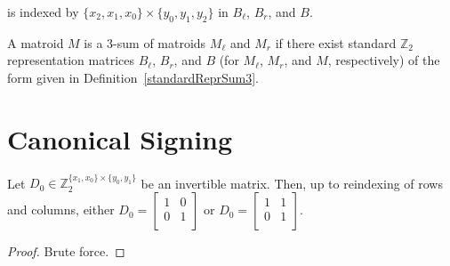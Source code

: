 \begin{definition}
    is indexed by $\{x_{2}, x_{1}, x_{0}\} \times \{y_{0}, y_{1}, y_{2}\}$ in $B_{\ell}$, $B_{r}$, and $B$.
\end{definition}

\begin{definition}
    \label{Matroid.IsSum3of}
    \leanok
    A matroid $M$ is a $3$-sum of matroids $M_{\ell}$ and $M_{r}$ if there exist standard $\mathbb{Z}_{2}$ representation matrices $B_{\ell}$, $B_{r}$, and $B$ (for $M_{\ell}$, $M_{r}$, and $M$, respectively) of the form given in Definition~\ref{standardReprSum3}.
\end{definition}


\section{Canonical Signing}

\begin{lemma}
    \label{Matrix.isUnit_2x2}
    \leanok
    Let $D_{0} \in \mathbb{Z}_{2}^{\{x_{1}, x_{0}\} \times \{y_{0}, y_{1}\}}$ be an invertible matrix. Then, up to reindexing of rows and columns, either $D_{0} = \begin{bmatrix} 1 & 0 \\ 0 & 1 \\ \end{bmatrix}$ or $D_{0} = \begin{bmatrix} 1 & 1 \\ 0 & 1 \\ \end{bmatrix}$.
\end{lemma}

\begin{proof}
    \uses{}
    \leanok
    Brute force.
\end{proof}

